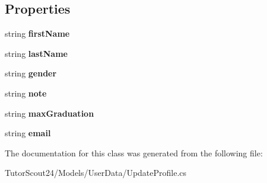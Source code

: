 \subsection*{Properties}
\begin{DoxyCompactItemize}
\item 
\mbox{\label{class_tutor_scout24_1_1_models_1_1_user_data_1_1_update_profile_a34801d3118645f6dfd854e680f06a06a}} 
string {\bfseries first\+Name}
\item 
\mbox{\label{class_tutor_scout24_1_1_models_1_1_user_data_1_1_update_profile_ada20727c7ab1bdb7771780621ffa5183}} 
string {\bfseries last\+Name}
\item 
\mbox{\label{class_tutor_scout24_1_1_models_1_1_user_data_1_1_update_profile_a026f688c6ba15bfeb76ea7aadc836225}} 
string {\bfseries gender}
\item 
\mbox{\label{class_tutor_scout24_1_1_models_1_1_user_data_1_1_update_profile_a58e6fc29c4607b81b42ac64149c78c70}} 
string {\bfseries note}
\item 
\mbox{\label{class_tutor_scout24_1_1_models_1_1_user_data_1_1_update_profile_a2269de70768981e845d40cc315a5ebec}} 
string {\bfseries max\+Graduation}
\item 
\mbox{\label{class_tutor_scout24_1_1_models_1_1_user_data_1_1_update_profile_a9bc0123606cfd2e9261e26539b8f7e3f}} 
string {\bfseries email}
\end{DoxyCompactItemize}


The documentation for this class was generated from the following file\+:\begin{DoxyCompactItemize}
\item 
Tutor\+Scout24/\+Models/\+User\+Data/Update\+Profile.\+cs\end{DoxyCompactItemize}
